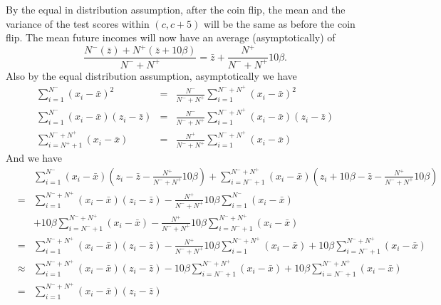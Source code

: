 \documentclass{article}
\begin{document}
\begin{itemize}
\begin{itemize}
       By the equal in distribution assumption,
       after the coin flip, the mean and the variance of the test scores within 
       $(c, c+5)$ will be the same as before the coin flip.
       The mean future incomes will now have an average (asymptotically)
       of
       $$
         \frac{N^-(\bar z) + N^+(\bar z + 10\beta)}{N^- + N^+} 
         = \bar z + \frac{N^+}{N^-+N^+}10\beta.
       $$
       Also by the equal distribution assumption, asymptotically we have
       \begin{eqnarray*}
          \sum_{i=1}^{N^-} (x_i - \bar x)^2
            & =& \frac{N^-}{N^- + N^+}\sum_{i=1}^{N^-+N^+} (x_i -\bar x)^2\\
          \sum_{i=1}^{N^-} (x_i - \bar x)(z_i - \bar z) 
            &=&  \frac{N^-}{N^- + N^+}\sum_{i=1}^{N^-+N^+}(x_i - \bar x)(z_i - \bar z) \\
          \sum_{i=N^++1}^{N^- + N^+} (x_i - \bar x) 
            & = & \frac{N^+}{N^- + N^+}\sum_{i=1}^{N^-+N^+}(x_i - \bar x)
       \end{eqnarray*}
       And we have
       \begin{eqnarray}
         && \sum_{i=1}^{N^-} (x_i - \bar x)(z_i - \bar z - \frac{N^+}{N^-+N^+}10\beta ) +
              \sum_{i=N^-+1}^{N^-+N^+} (x_i - \bar x)(z_i + 10\beta - \bar z - \frac{N^+}{N^-+N^+}10\beta)
              \nonumber \\
              &=& \sum_{i=1}^{N^-+N^+}(x_i -\bar x)(z_i - \bar z) - 
              \frac{N^+}{N^-+N^+}10\beta\sum_{i=1}^{N^-}(x_i - \bar x) \nonumber \\
              &&+ 10\beta\sum_{i = N^-+1}^{N^-+N^+}(x_i - \bar x)
              - \frac{N^+}{N^-+N^+} 10\beta \sum_{i = N^-+1}^{N^-+N^+} (x_i - \bar x) \nonumber \\
              &=&\sum_{i=1}^{N^-+N^+}(x_i -\bar x)(z_i - \bar z) 
              - \frac{N^+}{N^-+N^+} 10\beta \sum_{i = 1}^{N^-+N^+} (x_i - \bar x)
              + 10\beta\sum_{i = N^-+1}^{N^-+N^+}(x_i - \bar x) \nonumber \\
              &\approx& \sum_{i=1}^{N^-+N^+}(x_i -\bar x)(z_i - \bar z)
               - 10\beta\sum_{i = N^-+1}^{N^-+N^+}(x_i - \bar x)+ 
               10\beta\sum_{i = N^-+1}^{N^-+N^+}(x_i - \bar x) \nonumber\\
              & = &  \sum_{i=1}^{N^-+N^+}(x_i -\bar x)(z_i - \bar z) \label{hereseqn}
       \end{eqnarray}
       

\end{itemize}
\end{itemize}
\end{document}
